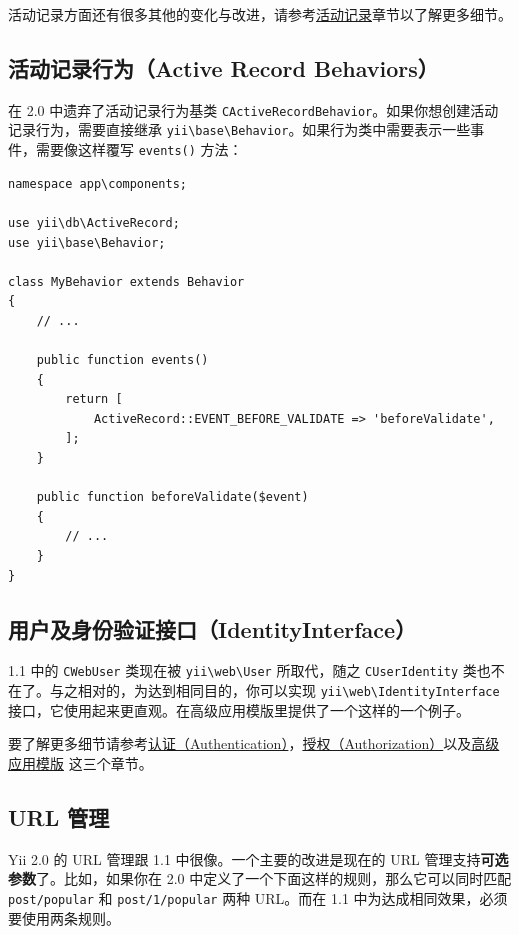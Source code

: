 活动记录方面还有很多其他的变化与改进，请参考\hyperref[db-active-record.md]{活动记录}章节以了解更多细节。

\subsection{活动记录行为（Active Record Behaviors）}
在 2.0 中遗弃了活动记录行为基类 \lstinline|CActiveRecordBehavior|。如果你想创建活动记录行为，需要直接继承 \lstinline|yii\base\Behavior|。如果行为类中需要表示一些事件，需要像这样覆写 \lstinline|events()| 方法：

\lstset{language=php}\begin{lstlisting}
namespace app\components;

use yii\db\ActiveRecord;
use yii\base\Behavior;

class MyBehavior extends Behavior
{
    // ...

    public function events()
    {
        return [
            ActiveRecord::EVENT_BEFORE_VALIDATE => 'beforeValidate',
        ];
    }

    public function beforeValidate($event)
    {
        // ...
    }
}
\end{lstlisting}
\subsection{用户及身份验证接口（IdentityInterface）}
1.1 中的 \lstinline|CWebUser| 类现在被 \texttt{yii{\allowbreak{}\textbackslash}web{\allowbreak{}\textbackslash}User} 所取代，随之 \lstinline|CUserIdentity| 类也不在了。与之相对的，为达到相同目的，你可以实现 \texttt{yii{\allowbreak{}\textbackslash}web{\allowbreak{}\textbackslash}IdentityInterface} 接口，它使用起来更直观。在高级应用模版里提供了一个这样的一个例子。

要了解更多细节请参考\hyperref[security-authentication.md]{认证（Authentication）}，\hyperref[security-authorization.md]{授权（Authorization）}以及\hyperref[tutorial-advanced-app.md]{高级应用模版} 这三个章节。

\subsection{URL 管理}
Yii 2.0 的 URL 管理跟 1.1 中很像。一个主要的改进是现在的 URL 管理支持\textbf{可选参数}了。比如，如果你在 2.0 中定义了一个下面这样的规则，那么它可以同时匹配 \lstinline|post/popular| 和 \lstinline|post/1/popular| 两种 URL。而在 1.1 中为达成相同效果，必须要使用两条规则。

